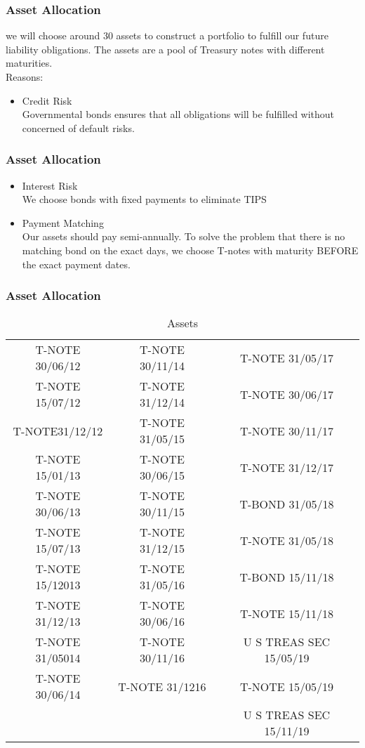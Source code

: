 \documentclass[compress,handout,10pt]{beamer}
\let\olditem\item
\renewcommand{\item}{\setlength{\itemsep}{0.5\baselineskip}\olditem}
\begin{document}
\begin{frame}
    \frametitle{Asset Allocation}
we will choose around 30 assets to construct a portfolio to fulfill our future liability obligations. The assets are a pool of Treasury notes with different maturities. \\
\vspace{3mm}
Reasons:\\
\vspace{3mm}
\begin{itemize}
\item Credit Risk \\
Governmental bonds ensures that all obligations will be fulfilled without concerned of default risks. 
\end{itemize}
\end{frame}

\begin{frame}
    \frametitle{Asset Allocation}
\begin{itemize}
\item Interest Risk \\
We choose bonds with fixed payments to eliminate TIPS
\vspace{8mm}
\item Payment Matching\\
Our assets should pay semi-annually. To solve the problem that there is no matching bond on the exact days, we choose T-notes with maturity BEFORE the exact payment dates. 
\end{itemize}
\end{frame}

\begin{frame}
    \frametitle{Asset Allocation}
\begin{table}[h]
\centering  
\begin{tabular}[width=6cm,height=4.5cm]{ccc}
\hline
T-NOTE 30/06/12  &T-NOTE 30/11/14       &T-NOTE  31/05/17\\
T-NOTE 15/07/12   &T-NOTE 31/12/14        &T-NOTE 30/06/17\\
T-NOTE31/12/12   &T-NOTE  31/05/15   &T-NOTE 30/11/17\\
T-NOTE 15/01/13    &T-NOTE 30/06/15  & T-NOTE 31/12/17\\
T-NOTE 30/06/13  & T-NOTE 30/11/15   &T-BOND  31/05/18\\
T-NOTE 15/07/13    &T-NOTE 31/12/15   &T-NOTE  31/05/18\\
T-NOTE 15/12013   &T-NOTE 31/05/16   &T-BOND 15/11/18\\
T-NOTE 31/12/13  & T-NOTE 30/06/16   &T-NOTE 15/11/18\\
T-NOTE 31/05014   &T-NOTE 30/11/16   &U S TREAS SEC 15/05/19\\
T-NOTE 30/06/14   &T-NOTE 31/1216  &T-NOTE 15/05/19\\
                                                &&U S TREAS SEC 15/11/19\\\hline
\end{tabular}
\caption{Assets}
\end{table}
\end{frame}
\end{document}

